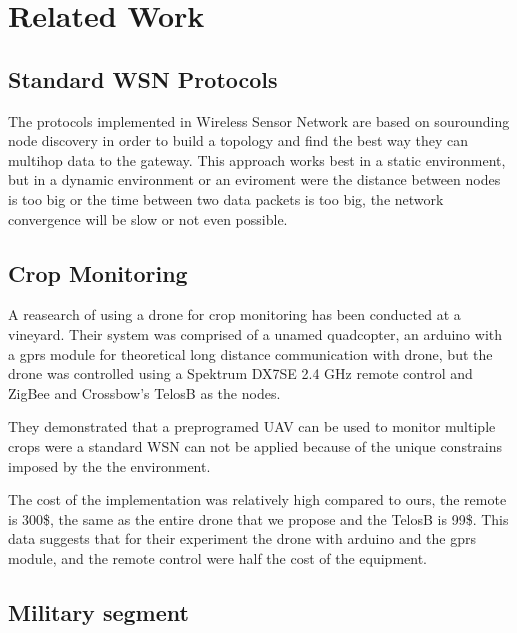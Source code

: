 \normalfont\normalsize
\chapter{Related Work}



\section{Standard WSN Protocols}

The protocols implemented in Wireless Sensor Network are based on sourounding node discovery in order to build a topology and find the best way they can multihop data to the gateway. This approach works best in a static environment, but in a dynamic environment or an eviroment were the distance between nodes is too big or the time between two data packets is too big, the network convergence will be slow or not even possible.

\section{Crop Monitoring}

A reasearch of using a drone for crop monitoring has been conducted at a vineyard. Their system was comprised of a unamed quadcopter, an arduino with a gprs module for theoretical long distance communication with drone, but the drone was controlled using a Spektrum DX7SE 2.4 GHz remote control and ZigBee and Crossbow’s TelosB as the nodes.

They demonstrated that a preprogramed UAV can be used to monitor multiple crops were a standard WSN can not be applied because of the unique constrains imposed by the the environment.

The cost of the implementation was relatively high compared to ours, the remote is 300\$, the same as the entire drone that we propose and the TelosB is 99\$. This data suggests that for their experiment the drone with arduino and the gprs module, and the remote control were half the cost of the equipment.

\section{Military segment}



